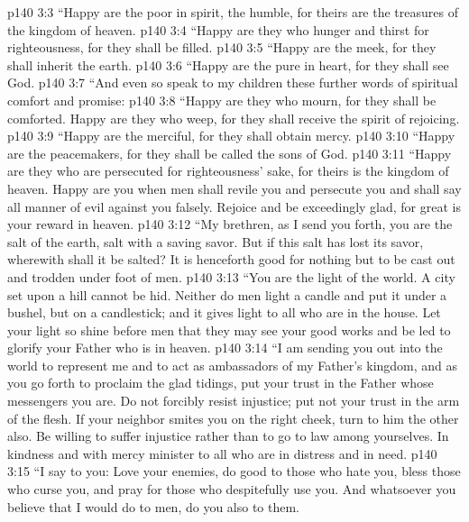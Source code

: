 \vs p140 3:3 \textcolor{ubdarkred}{“Happy are the poor in spirit, the humble, for theirs are the treasures of the kingdom of heaven.}
\vs p140 3:4 \textcolor{ubdarkred}{“Happy are they who hunger and thirst for righteousness, for they shall be filled.}
\vs p140 3:5 \textcolor{ubdarkred}{“Happy are the meek, for they shall inherit the earth.}
\vs p140 3:6 \textcolor{ubdarkred}{“Happy are the pure in heart, for they shall see God.}
\vs p140 3:7 \textcolor{ubdarkred}{“And even so speak to my children these further words of spiritual comfort and promise:}
\vs p140 3:8 \textcolor{ubdarkred}{“Happy are they who mourn, for they shall be comforted. Happy are they who weep, for they shall receive the spirit of rejoicing.}
\vs p140 3:9 \textcolor{ubdarkred}{“Happy are the merciful, for they shall obtain mercy.}
\vs p140 3:10 \textcolor{ubdarkred}{“Happy are the peacemakers, for they shall be called the sons of God.}
\vs p140 3:11 \textcolor{ubdarkred}{“Happy are they who are persecuted for righteousness’ sake, for theirs is the kingdom of heaven. Happy are you when men shall revile you and persecute you and shall say all manner of evil against you falsely. Rejoice and be exceedingly glad, for great is your reward in heaven.}
\vs p140 3:12 \textcolor{ubdarkred}{“My brethren, as I send you forth, you are the salt of the earth, salt with a saving savor. But if this salt has lost its savor, wherewith shall it be salted? It is henceforth good for nothing but to be cast out and trodden under foot of men.}
\vs p140 3:13 \textcolor{ubdarkred}{“You are the light of the world. A city set upon a hill cannot be hid. Neither do men light a candle and put it under a bushel, but on a candlestick; and it gives light to all who are in the house. Let your light so shine before men that they may see your good works and be led to glorify your Father who is in heaven.}
\vs p140 3:14 \textcolor{ubdarkred}{“I am sending you out into the world to represent me and to act as ambassadors of my Father’s kingdom, and as you go forth to proclaim the glad tidings, put your trust in the Father whose messengers you are. Do not forcibly resist injustice; put not your trust in the arm of the flesh. If your neighbor smites you on the right cheek, turn to him the other also. Be willing to suffer injustice rather than to go to law among yourselves. In kindness and with mercy minister to all who are in distress and in need.}
\vs p140 3:15 \textcolor{ubdarkred}{“I say to you: Love your enemies, do good to those who hate you, bless those who curse you, and pray for those who despitefully use you. And whatsoever you believe that I would do to men, do you also to them.}
